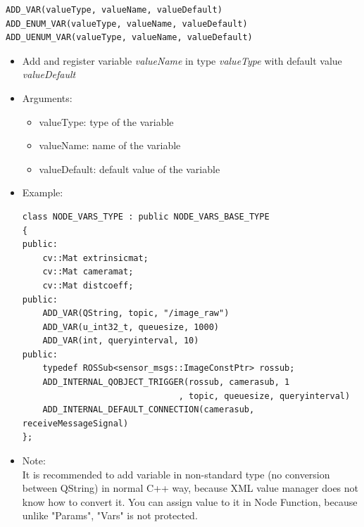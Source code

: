 \documentclass[a4paper,10pt]{book}
\begin{document}
\begin{mdframed}
\begin{verbatim}
ADD_VAR(valueType, valueName, valueDefault)
ADD_ENUM_VAR(valueType, valueName, valueDefault)
ADD_UENUM_VAR(valueType, valueName, valueDefault)
\end{verbatim}
\begin{itemize}
 \item Add and register variable {\em{valueName}} in type {\em{valueType}} with default value {\em{valueDefault}}
 \item Arguments:
 \begin{itemize}
  \item valueType: type of the variable
  \item valueName: name of the variable
  \item valueDefault: default value of the variable
 \end{itemize}
 \item Example:
 \begin{verbatim}
class NODE_VARS_TYPE : public NODE_VARS_BASE_TYPE
{
public:
    cv::Mat extrinsicmat;
    cv::Mat cameramat;
    cv::Mat distcoeff;
public:
    ADD_VAR(QString, topic, "/image_raw")
    ADD_VAR(u_int32_t, queuesize, 1000)
    ADD_VAR(int, queryinterval, 10)
public:
    typedef ROSSub<sensor_msgs::ImageConstPtr> rossub;
    ADD_INTERNAL_QOBJECT_TRIGGER(rossub, camerasub, 1
                               , topic, queuesize, queryinterval)
    ADD_INTERNAL_DEFAULT_CONNECTION(camerasub, receiveMessageSignal)
};
 \end{verbatim}
 \item Note: \\It is recommended to add variable in non-standard type (no conversion between QString) in normal C++ way, because XML value manager does not know how to convert it. You can assign value to it in Node Function, because unlike "Params", "Vars" is not protected.
\end{itemize}
\end{mdframed}
\end{document}
